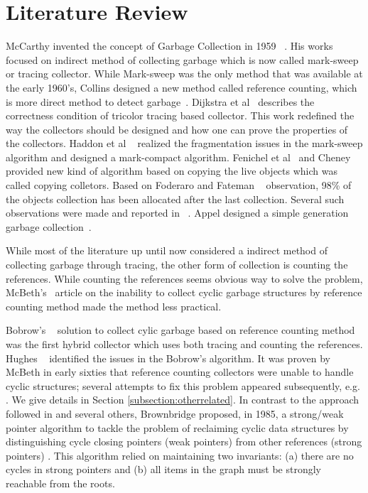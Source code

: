 \section{Literature Review}
McCarthy invented the concept of Garbage Collection in 1959 ~\cite{mccarthy}. His works focused on indirect method of collecting 
garbage which is now called mark-sweep or tracing collector. While Mark-sweep was the only method that was available at the early 1960's,
 Collins designed a new method called reference counting, which is more direct method to detect garbage~\cite{Collins1960}. 
 Dijkstra et al~\cite{dijkstra} describes the correctness condition of tricolor tracing based collector. This work redefined the 
 way the collectors should be designed and how one can prove the properties of the collectors. Haddon et al ~\cite{haddon} realized 
 the fragmentation issues in the mark-sweep algorithm and designed a mark-compact algorithm. Fenichel et al~\cite{feni} and Cheney~\cite{cheney}
 provided new kind of algorithm based on copying the live objects which was called copying colletors. Based on Foderaro and Fateman ~\cite{fode81} observation, 
 98\% of the objects collection has been allocated after the last collection. Several such observations were made and reported in ~\cite{zorn89,sans93}.
 Appel designed a simple generation garbage collection~\cite{Appel89}.
 
 While most of the literature up until now considered a indirect method of collecting garbage through tracing, the other form of collection is counting the references.
 While counting the references seems obvious way to solve the problem, McBeth's~\cite{McBeth1963} article on the inability to collect cyclic garbage structures by 
 reference counting method made the method less practical.

Bobrow's ~\cite{Bobrow1980} solution to collect cylic garbage based on reference counting method was the first hybrid collector which uses both tracing and
counting the references. Hughes ~\cite{hugh83,hugh87} identified the issues in the Bobrow's algorithm.
It was proven by McBeth \cite{McBeth1963} in early sixties that reference counting collectors were unable to handle cyclic structures; several attempts to fix this problem appeared subsequently, e.g. \cite{Friedman1979,Bobrow1980,Lins2008}. We give details in Section \ref{subsection:otherrelated}.
In contrast to the approach followed in \cite{Friedman1979,Bobrow1980,Lins2008} and several others,
Brownbridge \cite{Brownbridge1985} proposed, in 1985, a strong/weak pointer algorithm to tackle the problem of reclaiming cyclic data structures by distinguishing cycle closing pointers (weak pointers) from other references (strong pointers) \cite{Jones1996}. %
This algorithm relied on maintaining two invariants: (a) there are no cycles in strong pointers and (b) all items in the graph must be strongly reachable from the roots.

